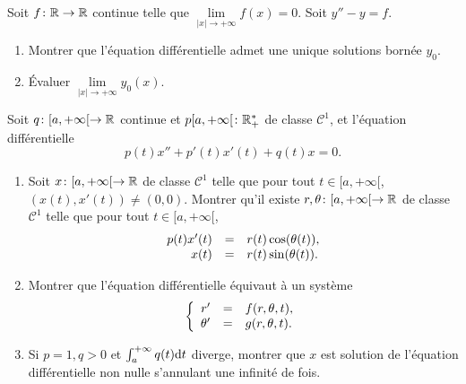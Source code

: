 \documentclass[12pt]{article}
\begin{document}
\begin{exercise}
	Soit $f\colon\mathbb{R}\to\mathbb{R}$ continue telle que $\lim\limits_{\left\lvert x\right\rvert\to+\infty}f(x)=0$. Soit $y''-y=f$. 
	\begin{enumerate}
		\item Montrer que l'équation différentielle admet une unique solutions bornée $y_0$.
		\item Évaluer $\lim\limits_{\left\lvert x\right\rvert\to+\infty}y_0(x)$.
	\end{enumerate}
\end{exercise}

\begin{exercise}
	Soit $q\colon[a,+\infty[\to\mathbb{R}$ continue et $p[a,+\infty[\colon\mathbb{R}_{+}^{*}$ de classe $\mathcal{C}^{1}$, et l'équation différentielle 
	\begin{equation*}
		p(t)x''+p'(t)x'(t)+q(t)x=0.
	\end{equation*}
	\begin{enumerate}
		\item Soit $x\colon[a,+\infty[\to\mathbb{R}$ de classe $\mathcal{C}^{1}$ telle que pour tout $t\in[a,+\infty[$, $(x(t),x'(t))\neq(0,0)$. Montrer qu'il existe $r,\theta\colon[a,+\infty[\to\mathbb{R}$ de classe $\mathcal{C}^{1}$ telle que pour tout $t\in[a,+\infty[$,
		\begin{equation*}
			\begin{array}[]{rcl}
				p(t)x'(t)&=&r(t)\cos(\theta(t)),\\
				x(t)&=&r(t)\sin(\theta(t)).
			\end{array}
		\end{equation*}

		\item Montrer que l'équation différentielle équivaut à un système
		\begin{equation*}
			\left\lbrace
				\begin{array}[]{rcl}
					r'&=&f(r,\theta,t),\\
					\theta'&=&g(r,\theta,t).
				\end{array}
			\right.
		\end{equation*}

		\item Si $p=1,q>0$ et $\int_{a}^{+\infty}q(t)\mathrm{d} t$ diverge, montrer que $x$ est solution de l'équation différentielle non nulle s'annulant une infinité de fois.
	\end{enumerate}
\end{exercise}
\end{document}

